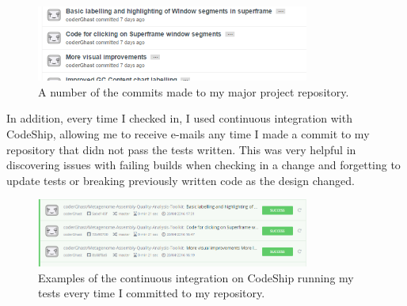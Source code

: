 \begin{figure}[H]
\centering
\includegraphics[width=0.8\textwidth]{images/commits}
\caption{A number of the commits made to my major project repository.}
\end{figure}

In addition, every time I checked in, I used continuous integration with CodeShip\cite{codeship}, allowing me to receive e-mails any time I made a commit to my repository that didn not pass the tests written. This was very helpful in discovering issues with failing builds when checking in a change and forgetting to update tests or breaking previously written code as the design changed.

\begin{figure}[H]
\centering
\includegraphics[width=0.8\textwidth]{images/codeship}
\caption{Examples of the continuous integration on CodeShip running my tests every time I committed to my repository.}
\end{figure}